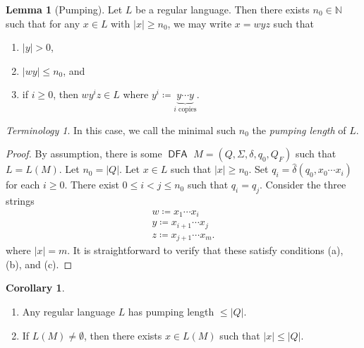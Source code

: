 \documentclass[10pt,letterpaper,cm]{nupset}
\theoremstyle{definition}
\theoremstyle{theorem}
\newtheorem{lemma}[definition]{Lemma}
\newtheorem{corollary}[definition]{Corollary}
\theoremstyle{remark}
\newtheorem*{term}{Terminology}
\newcommand{\N}{\mathbb N}
\newcommand{\1}{\mathbf{1}}
\newcommand{\0}{\vec 0}
\DeclareMathOperator{\DFA}{\mathsf{DFA}}
\begin{document}
\begin{lemma}[Pumping] Let $L$ be a regular language. Then there exists $n_0 \in \N$ such that for any $x\in L$ with $\left\lvert{x}\right\rvert\geq n_0$, we may write $x=wyz$ such that
\begin{enumerate}[label=(\alph*)]
\item $\left\lvert{y}\right\rvert >0$,
\item $\left\lvert{wy}\right\rvert\leq n_0$, and
\item if $i\geq 0$, then $wy^iz \in L$ where $y^i \coloneqq \underbrace{y\cdots y}_{i \text{ copies}}$.
\end{enumerate}
\end{lemma}
\begin{term}
In this case, we call the minimal such $n_0$ the \textit{pumping length} of $L$.
\end{term}
\begin{proof}
By assumption, there is some $\DFA$ $M = \left(Q, \Sigma, \delta, q_0, Q_F\right)$ such that $L = L(M)$. Let $n_0 = \left\lvert{Q}\right\rvert$. Let $x\in L$ such that $\left\lvert{x}\right\rvert\geq n_0$. Set $q_i = \hat{\delta}(q_0, x_0 \cdots x_i)$ for each $i\geq 0$.  There exist $0\leq i<j \leq n_0$ such that $q_i = q_j$. Consider the three strings 
\begin{gather*}
w\coloneqq x_1\cdots x_i 
\\  y\coloneqq  x_{i+1}\cdots x_j 
\\  z\coloneqq x_{j+1} \cdots x_m.
\end{gather*}
where $\left\lvert{x}\right\rvert = m$. It is straightforward to verify that these satisfy conditions (a), (b), and (c).
\end{proof}
\begin{corollary} $ $
\begin{enumerate} 
\item Any regular language $L$ has pumping length $\leq \left\lvert{Q}\right\rvert$.
\item If $L(M) \ne \emptyset$, then there exists $x\in L(M)$ such that $\left\lvert{x}\right\rvert \leq \left\lvert{Q}\right\rvert$.
\end{enumerate}
\end{corollary}
\end{document}
